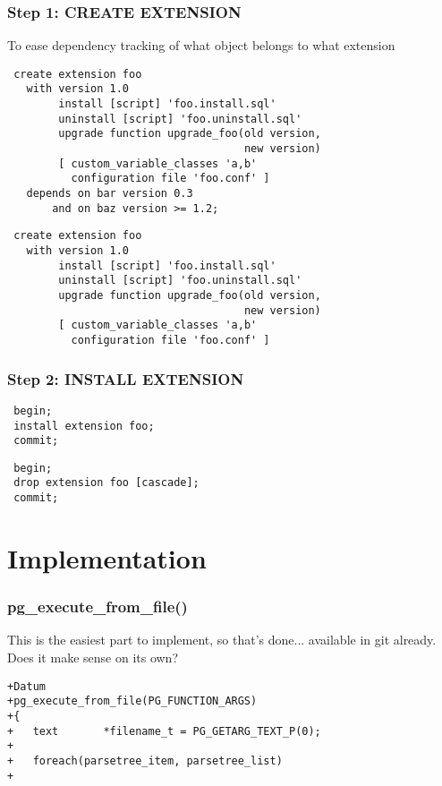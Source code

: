 \documentclass[english]{beamer}
\begin{document}
\begin{frame}[fragile]
  \frametitle{Step 1: CREATE EXTENSION}

  To ease dependency tracking of what object belongs to what extension

\begin{example}
  \begin{overprint}
\begin{verbatim}
 create extension foo 
   with version 1.0
        install [script] 'foo.install.sql'
        uninstall [script] 'foo.uninstall.sql'
        upgrade function upgrade_foo(old version, 
                                     new version)
        [ custom_variable_classes 'a,b' 
          configuration file 'foo.conf' ]
   depends on bar version 0.3
       and on baz version >= 1.2;
\end{verbatim}

\begin{verbatim}
 create extension foo 
   with version 1.0
        install [script] 'foo.install.sql'
        uninstall [script] 'foo.uninstall.sql'
        upgrade function upgrade_foo(old version, 
                                     new version)
        [ custom_variable_classes 'a,b' 
          configuration file 'foo.conf' ]
\end{verbatim}
  \end{overprint}
\end{example}
\end{frame}

\begin{frame}[fragile]
  \frametitle{Step 2: INSTALL EXTENSION}

\begin{example}
\begin{verbatim}
 begin;
 install extension foo;
 commit;
\end{verbatim}
\end{example}

\begin{example}
\begin{verbatim}
 begin;
 drop extension foo [cascade];
 commit;
\end{verbatim}
\end{example}
\end{frame}

\section{Implementation}
\begin{frame}[fragile]
  \frametitle{pg\_execute\_from\_file()}

  This is the easiest part to implement, so that's done... available in git
  already. Does it make sense on its own?

\begin{example}
\begin{verbatim}
+Datum
+pg_execute_from_file(PG_FUNCTION_ARGS)
+{
+	text	   *filename_t = PG_GETARG_TEXT_P(0);
+
+	foreach(parsetree_item, parsetree_list)
+
\end{verbatim}
\end{example}
\end{frame}
\end{document}
